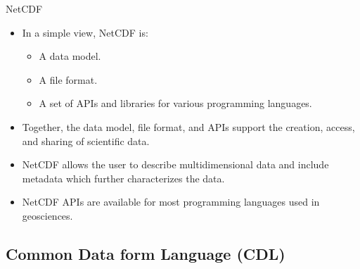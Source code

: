 \documentclass[compress,11pt,xcolor=svgnames,aspectratio=169]{beamer}
\begin{document}
\begin{frame}[fragile]{NetCDF}

\begin{itemize}
\setlength\itemsep{0.4cm}

\item In a simple view, NetCDF is:

    \begin{itemize}
        \item A data model.
        \item A file format.
        \item A set of APIs and libraries for various programming languages.
    \end{itemize}

\item Together, the data model, file format, and APIs support the creation, access, and sharing of scientific data.

\item NetCDF allows the user to describe multidimensional data and include metadata which further characterizes the data.

\item NetCDF APIs are available for most programming languages used in geosciences.

\end{itemize}

\nocite{netcdf}

\end{frame}

\subsection{Common Data form Language (CDL)}
\end{document}
